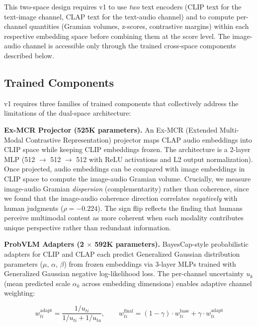 \documentclass[a4paper,fleqn]{cas-sc}
\begin{document}
\begin{itemize}
This two-space design requires v1 to use \emph{two} text encoders (CLIP text for the text-image channel, CLAP text for the text-audio channel) and to compute per-channel quantities (Gramian volumes, z-scores, contrastive margins) within each respective embedding space before combining them at the score level. The image-audio channel is accessible only through the trained cross-space components described below.

\subsection{Trained Components}\label{sec:v1-trained}

v1 requires three families of trained components that collectively address the limitations of the dual-space architecture:

\textbf{Ex-MCR Projector (525K parameters).} An Ex-MCR (Extended Multi-Modal Contrastive Representation) projector maps CLAP audio embeddings into CLIP space while keeping CLIP embeddings frozen. The architecture is a 2-layer MLP (512 $\rightarrow$ 512 $\rightarrow$ 512 with ReLU activations and L2 output normalization). Once projected, audio embeddings can be compared with image embeddings in CLIP space to compute the image-audio Gramian volume. Crucially, we measure image-audio Gramian \emph{dispersion} (complementarity) rather than coherence, since we found that the image-audio coherence direction correlates \emph{negatively} with human judgments ($\rho = -0.224$). The sign flip reflects the finding that humans perceive multimodal content as more coherent when each modality contributes unique perspective rather than redundant information.

\textbf{ProbVLM Adapters (2 $\times$ 592K parameters).} BayesCap-style probabilistic adapters for CLIP and CLAP each predict Generalized Gaussian distribution parameters ($\mu$, $\alpha$, $\beta$) from frozen embeddings via 3-layer MLPs trained with Generalized Gaussian negative log-likelihood loss. The per-channel uncertainty $u_k$ (mean predicted scale $\alpha_k$ across embedding dimensions) enables adaptive channel weighting:

\begin{equation}\label{eq:v1-adaptive}
w_{ti}^{\mathrm{adapt}} = \frac{1/u_{ti}}{1/u_{ti} + 1/u_{ta}}, \qquad w_{ti}^{\mathrm{final}} = (1 - \gamma) \cdot w_{ti}^{\mathrm{base}} + \gamma \cdot w_{ti}^{\mathrm{adapt}}
\end{equation}


\end{itemize}
\end{document}
